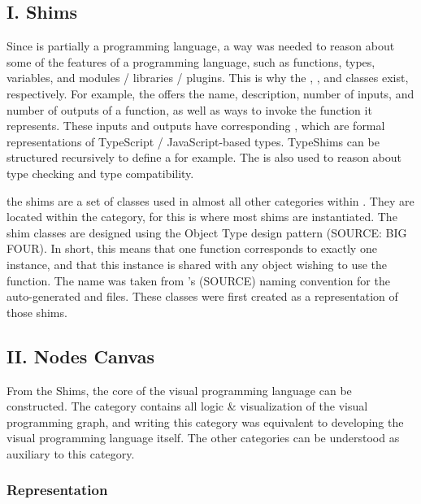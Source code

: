 \subsection*{I. Shims}

Since \geofront{} is partially a programming language, a way was needed to reason about some of the features of a programming language, such as functions, types, variables, and modules / libraries / plugins. 
This is why the , ,  and  classes exist, respectively. 
For example, the  offers the name, description, number of inputs, and number of outputs of a function, as well as ways to invoke the function it represents.
These inputs and outputs have corresponding , which are formal representations of TypeScript / JavaScript-based types. TypeShims can be structured recursively to define a  for example. The  is also used to reason about type checking and type compatibility.

the shims are a set of classes used in almost all other categories within \geofront{}. They are located within the  category, for this is where most shims are instantiated.
The shim classes are designed using the Object Type design pattern (SOURCE: BIG FOUR). In short, this means that one function corresponds to exactly one  instance, and that this instance is shared with any object wishing to use the function. 
The name  was taken from 's (SOURCE) naming convention for the auto-generated  and  files. These classes were first created as a representation of those shims.


\subsection*{II. Nodes Canvas}
From the Shims, the core of the visual programming language can be constructed. The  category contains all logic \& visualization of the visual programming graph, and writing this category was equivalent to developing the visual programming language itself. The other categories can be understood as auxiliary to this category.

\subsubsection*{ Representation }

